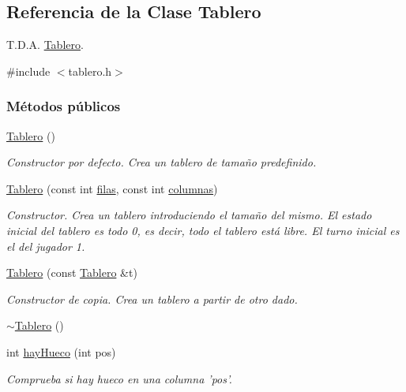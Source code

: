 \hypertarget{classTablero}{\subsection{Referencia de la Clase Tablero}
\label{classTablero}
}


T.\-D.\-A. \hyperlink{classTablero}{Tablero}.  




{\ttfamily \#include $<$tablero.\-h$>$}

\subsubsection*{Métodos públicos}
\begin{DoxyCompactItemize}
\item 
\hyperlink{classTablero_ab4912f28f1db392e1dd44ddc98bd4f59}{Tablero} ()
\begin{DoxyCompactList}\small\item\em Constructor por defecto. Crea un tablero de tamaño predefinido. \end{DoxyCompactList}\item 
\hyperlink{classTablero_a51ae562c7dee2909d0fa335b8c3eaf71}{Tablero} (const int \hyperlink{classTablero_a6b1f04a8502106c33bf5469f791320e6}{filas}, const int \hyperlink{classTablero_ac70289ec91b44d05da648770cc46801d}{columnas})
\begin{DoxyCompactList}\small\item\em Constructor. Crea un tablero introduciendo el tamaño del mismo. El estado inicial del tablero es todo 0, es decir, todo el tablero está libre. El turno inicial es el del jugador 1. \end{DoxyCompactList}\item 
\hyperlink{classTablero_a95ccd1353038a966ad3304ead106c0d4}{Tablero} (const \hyperlink{classTablero}{Tablero} \&t)
\begin{DoxyCompactList}\small\item\em Constructor de copia. Crea un tablero a partir de otro dado. \end{DoxyCompactList}\item 
\hyperlink{classTablero_a7d4a64967ce0bbe2cce49ec846834c84}{$\sim$\-Tablero} ()
\item 
int \hyperlink{classTablero_ada687d3c234c4fb416ca76461adf6ba4}{hay\-Hueco} (int pos)
\begin{DoxyCompactList}\small\item\em Comprueba si hay hueco en una columna 'pos'. \end{DoxyCompactList}\item 

\end{DoxyCompactItemize}
